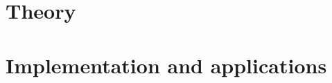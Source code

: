 \documentclass[12pt,a4paper,fleqn]{report}
\begin{document}



\tableofcontents

%
\part{Theory}



%
%



%

%
%
\part{Implementation and applications}
%

%







%

%

%
% 
\end{document}
